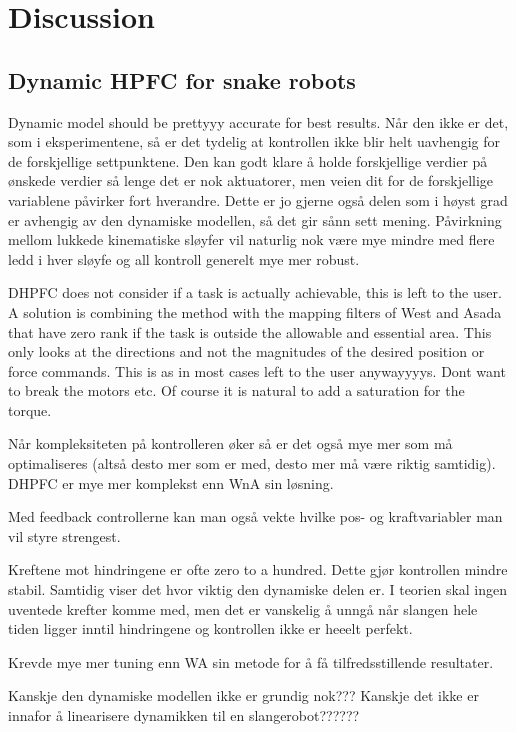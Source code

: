 \chapter{Discussion}\label{ch:discussion}


\section{Dynamic HPFC for snake robots}

Dynamic model should be prettyyy accurate for best results. Når den ikke er det, som i eksperimentene, så er det tydelig at kontrollen ikke blir helt uavhengig for de forskjellige settpunktene. Den kan godt klare å holde forskjellige verdier på ønskede verdier så lenge det er nok aktuatorer, men veien dit for de forskjellige variablene påvirker fort hverandre. Dette er jo gjerne også delen som i høyst grad er avhengig av den dynamiske modellen, så det gir sånn sett mening. Påvirkning mellom lukkede kinematiske sløyfer vil naturlig nok være mye mindre med flere ledd i hver sløyfe og all kontroll generelt mye mer robust.

DHPFC does not consider if a task is actually achievable, this is left to the user. A solution is combining the method with the mapping filters of West and Asada that have zero rank if the task is outside the allowable and essential area. This only looks at the directions and not the magnitudes of the desired position or force commands. This is as in most cases left to the user anywayyyys. Dont want to break the motors etc. Of course it is natural to add a saturation for the torque.

Når kompleksiteten på kontrolleren øker så er det også mye mer som må optimaliseres (altså desto mer som er med, desto mer må være riktig samtidig). DHPFC er mye mer komplekst enn WnA sin løsning.

Med feedback controllerne kan man også vekte hvilke pos- og kraftvariabler man vil styre strengest.

Kreftene mot hindringene er ofte zero to a hundred. Dette gjør kontrollen mindre stabil. Samtidig viser det hvor viktig den dynamiske delen er. I teorien skal ingen uventede krefter komme med, men det er vanskelig å unngå når slangen hele tiden ligger inntil hindringene og kontrollen ikke er heeelt perfekt.

Krevde mye mer tuning enn WA sin metode for å få tilfredsstillende resultater.

Kanskje den dynamiske modellen ikke er grundig nok??? Kanskje det ikke er innafor å linearisere dynamikken til en slangerobot??????

